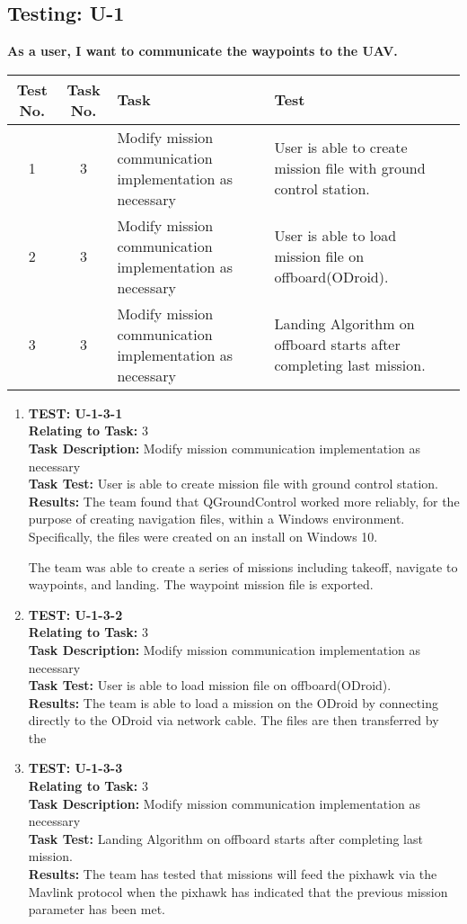 \subsection{Testing: U-1}
\textbf{As a user, I want to communicate the waypoints to the UAV.}\\
\begin{tabular}{| c | c | >{\raggedright}m{4cm} | m{4cm} | c |}\hline
	Test No. & Task No. & Task & Test\\\hline
	1 & 3 & Modify mission communication implementation as necessary & User is able to create mission file with ground control station.\\\hline
	2 & 3 & Modify mission communication implementation as necessary & User is able to load mission file on offboard(ODroid).\\\hline
	3 & 3 & Modify mission communication implementation as necessary & Landing Algorithm on offboard starts after completing last mission.\\\hline
\end{tabular}
\begin{enumerate}
\item \textbf{TEST: U-1-3-1}\\
\textbf{Relating to Task:} 3\\
\textbf{Task Description:} Modify mission communication implementation as necessary\\
\textbf{Task Test:} User is able to create mission file with ground control station.\\
\textbf{Results:} The team found that QGroundControl worked more reliably, for the purpose of creating navigation files, within a Windows environment. Specifically, the files were created on an install on Windows 10.\par 
The team was able to create a series of missions including takeoff, navigate to waypoints, and landing. The waypoint mission file is exported.

\item \textbf{TEST: U-1-3-2}\\
\textbf{Relating to Task:} 3\\
\textbf{Task Description:} Modify mission communication implementation as necessary\\
\textbf{Task Test:} User is able to load mission file on offboard(ODroid).\\
\textbf{Results:} The team is able to load a mission on the ODroid by connecting directly to the ODroid via network cable. The files are then transferred by the 

\item \textbf{TEST: U-1-3-3}\\
\textbf{Relating to Task:} 3\\
\textbf{Task Description:} Modify mission communication implementation as necessary\\
\textbf{Task Test:} Landing Algorithm on offboard starts after completing last mission.\\
\textbf{Results:} The team has tested that missions will feed the pixhawk via the Mavlink protocol when the pixhawk has indicated that the previous mission parameter has been met. 
\end{enumerate}
	
